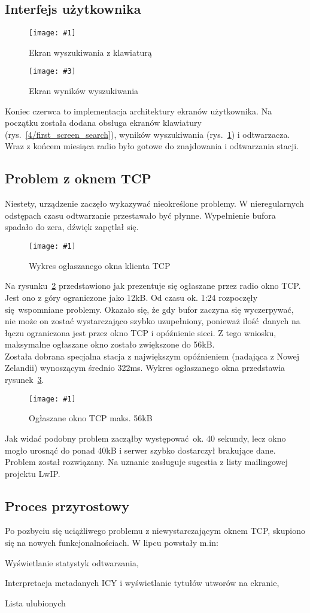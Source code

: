\documentclass[polish]{aghengthesis}
\let\tempone\itemize
\let\temptwo\enditemize
\renewenvironment{itemize}{\tempone\setlength{\itemsep}{0cm}}{\temptwo}
\newcommand{\imgint}[4]{
	\begin{figure}[{#4}]
		\centering
		\texttt{[image: \#1]}
		\caption{#2}
		\label{#1}
	\end{figure}
}
\newcommand{\imgh}[3]{\imgint{#1}{#2}{#3}{H}}
\newcommand{\imgintss}[5]{
	\begin{figure}[{#5}]
		\centering
		\begin{minipage}{.45\textwidth}
			\centering
			\texttt{[image: \#1]}
			\caption{#2}
			\label{#1}
		\end{minipage}%
		\hfill
		\begin{minipage}{.45\textwidth}
			\centering
			\texttt{[image: \#3]}
			\caption{#4}
			\label{#3}
		\end{minipage}
	\end{figure}
}
\newcommand{\imghss}[4]{\imgintss{#1}{#2}{#3}{#4}{H}}
\begin{document}
		\subsection{Interfejs użytkownika}
			\imghss{4/first_screen_search}{Ekran wyszukiwania z klawiaturą}{4/first_screen_res}{Ekran wyników wyszukiwania}
		
			Koniec czerwca to implementacja architektury ekranów użytkownika. Na początku została dodana obsługa ekranów klawiatury (rys.~\ref{4/first_screen_search}), wyników wyszukiwania (rys.~\ref{4/first_screen_res}) i odtwarzacza. Wraz z końcem miesiąca radio było gotowe do znajdowania i odtwarzania stacji.
			
		\subsection{Problem z oknem TCP}
			Niestety, urządzenie zaczęło wykazywać nieokreślone problemy. W nieregularnych odstępach czasu odtwarzanie przestawało być płynne. Wypełnienie bufora spadało do zera, dźwięk zapętlał się.
			
			\imgh{4/tcp_fail}{Wykres ogłaszanego okna klienta TCP}{0.85}
			
			Na rysunku~\ref{4/tcp_fail} przedstawiono jak prezentuje się ogłaszane przez radio okno TCP. Jest ono z góry ograniczone jako 12kB. Od czasu ok. 1:24 rozpoczęły się wspomniane problemy. Okazało się, że gdy bufor zaczyna się wyczerpywać, nie może on zostać wystarczająco szybko uzupełniony, ponieważ ilość danych na łączu ograniczona jest przez okno TCP i opóźnienie sieci. Z tego wniosku, maksymalne ogłaszane okno zostało zwiększone do 56kB.
			$ $\\
			
			Została dobrana specjalna stacja z największym opóźnieniem (nadająca z Nowej Zelandii) wynoszącym średnio 322ms. Wykres ogłaszanego okna przedstawia rysunek~\ref{4/tcp_good}.
			
			\imgh{4/tcp_good}{Ogłaszane okno TCP maks. 56kB}{0.6}

			Jak widać podobny problem zacząłby występować ok. 40 sekundy, lecz okno mogło urosnąć do ponad 40kB i serwer szybko dostarczył brakujące dane. Problem został rozwiązany. Na uznanie zasługuje sugestia z listy mailingowej projektu LwIP. %
			
		\subsection{Proces przyrostowy}
			Po pozbyciu się uciążliwego problemu z niewystarczającym oknem TCP, skupiono się na nowych funkcjonalnościach. W lipcu powstały m.in:
			\begin{itemize}
				\item Wyświetlanie statystyk odtwarzania,
				\item Interpretacja metadanych ICY i wyświetlanie tytułów utworów na ekranie,
				\item Lista ulubionych
			\end{itemize}
			
\end{document}
